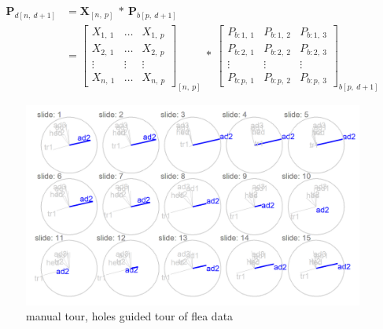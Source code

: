 \documentclass{monashthesis}
\begin{document}
\begin{align}
  \textbf{P}_{d[n,~d+1]}
    &= \textbf{X}_{[n,~p]} ~*~ \textbf{P}_{b[p,~d+1]} \\
    &= \begin{bmatrix}
      X_{1,~1} & \dots & X_{1,~p} \\
      X_{2,~1} & \dots & X_{2,~p} \\
      \vdots   & \vdots & \vdots  \\
      X_{n,~1} & \dots & X_{n,~p}
    \end{bmatrix}_{[n,~p]}
      ~*~
    \begin{bmatrix}
      P_{b:1,~1} & P_{b:1,~2} & P_{b:1,~3} \\
      P_{b:2,~1} & P_{b:2,~2} & P_{b:2,~3} \\
      \vdots     & \vdots     & \vdots     \\
      P_{b:p,~1} & P_{b:p,~2} & P_{b:p,~3}
    \end{bmatrix}_{b[p,~d+1]}
\end{align}

\begin{figure}
\includegraphics[width=27.78in]{./output/step3_manual_tour} \caption{manual tour, holes guided tour of flea data}\label{fig:step3}
\end{figure}
\end{document}
